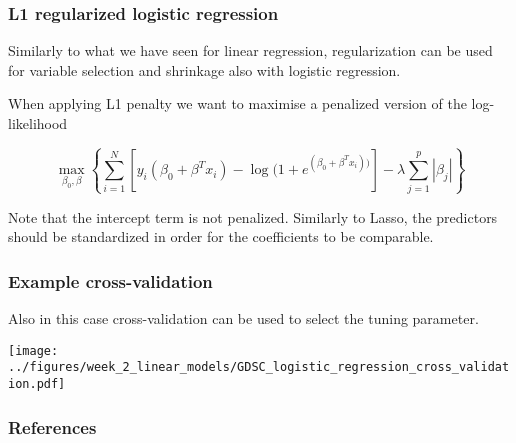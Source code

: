 \documentclass[notes]{beamer}          %
\begin{document}
\begin{frame}
\frametitle{L1 regularized logistic regression}

Similarly to what we have seen for linear regression, regularization can be used for variable selection and shrinkage also with logistic regression.

\vspace{5mm} 

When applying L1 penalty we want to maximise a penalized version of the log-likelihood

\begin{equation*}
    \max_{\beta_0, \beta} \left\{ \sum_{i=1}^N [ y_i(\beta_0 + \beta^T x_i) - \log (1+e^{(\beta_0 + \beta^T x_i))}] -\lambda \sum_{j=1}^p | \beta_j| \right\}
\end{equation*}

Note that the intercept term is not penalized. Similarly to Lasso, the predictors should be standardized in order for the coefficients to be comparable.

\end{frame}

\begin{frame}
\frametitle{Example cross-validation}

Also in this case cross-validation can be used to select the tuning parameter.

\begin{center}
\texttt{[image: ../figures/week\_2\_linear\_models/GDSC\_logistic\_regression\_cross\_validation.pdf]}
\end{center}

\end{frame}


\begin{frame}
\frametitle{References}
\printbibliography
\end{frame}
\end{document}
